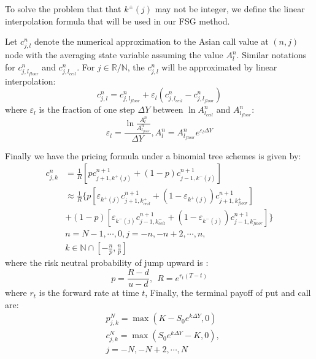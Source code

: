 \documentclass[10pt, a4paper, twocolumn]{article} %
\begin{document}
To solve the problem that that $ k^\pm(j) $ may not be integer, we define the linear interpolation formula that will be used in our FSG method.

Let $ c^n_{j, l} $ denote the numerical approximation to the Asian call value at $ (n, j) $ node with the averaging state variable assuming the value $ A^n_l $. Similar notations for $ c^n_{j, l_{floor}} $ and $ c^n_{j, l_{ceil}} $. For $ j \in \mathbb{R} / \mathbb{N} $, the $ c^n_{j, l} $ will be approximated by linear interpolation:
\begin{equation}\label{arith: interpolation}
c^n_{j, l} = c^n_{j, l_{floor}} + \varepsilon_l (c^n_{j, l_{ceil}} - c^n_{j, l_{floor}})
\end{equation}
where $ \varepsilon_l $ is the fraction of one step $ \Delta Y $ between $ \ln A^n_{l_{ceil}} $ and $ A^n_{l_{floor}} $:
\begin{equation}
\varepsilon_l = \frac{\ln\frac{A^n_l}{A^n_{l_{floor}}}}{\Delta Y}, A^n_l =  A^n_{l_{floor}} e^{\varepsilon_l \Delta Y}
\end{equation}

Finally we have the pricing formula under a binomial tree schemes is given by:
\begin{equation}\label{arith: back induction}
\begin{split}
c^n_{j, k} &= \frac{1}{R} \left[ p c^{n + 1}_{j + 1, k^+(j)} + (1 - p) c^{n + 1}_{j - 1, k^-(j)}\right] \\
&\approx \frac{1}{R} \{ p \left[ \varepsilon_{k^+(j)} c^{n + 1}_{j + 1, k^+_{ceil}} + (1 - \varepsilon_{k^+(j)}) c^{n + 1}_{j + 1, k^+_{floor}} \right] \\
&+ (1 - p) \left[ \varepsilon_{k^-(j)} c^{n + 1}_{j - 1, k^-_{ceil}} + (1 - \varepsilon_{k^-(j)}) c^{n + 1}_{j - 1, k^-_{floor}} \right]\} \\
&n = N - 1, \cdots, 0, j = -n, -n + 2, \cdots, n, \\
&k \in \mathbb{N} \cap [-\frac{n}{p}, \frac{n}{p}]
\end{split} 
\end{equation}
where the risk neutral probability of jump upward is :
\begin{equation}
p=\frac{R-d}{u-d}, \ \ R = e^{r_t (T - t)}
\end{equation}
where $ r_t $ is the forward rate at time $ t $, Finally, the terminal payoff of put and call are:
\begin{equation}\label{arith: terminal}
\begin{split}
&p^N_{j, k} = \max(K - S_0 e^{k \Delta Y}, 0) \\
&c^N_{j, k} = \max(S_0 e^{k \Delta Y} - K, 0), \\
&j = -N, -N + 2, \cdots, N
\end{split}
\end{equation}
\end{document}
